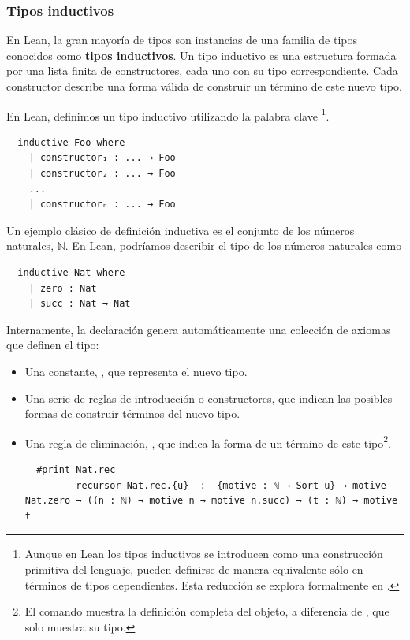 \subsubsection{Tipos inductivos}

En Lean, la gran mayoría de tipos son instancias de una familia de tipos conocidos como \textbf{tipos inductivos}. Un tipo inductivo es una estructura formada por una lista finita de constructores, cada uno con su tipo correspondiente. Cada constructor describe una forma válida de construir un término de este nuevo tipo.

En Lean, definimos un tipo inductivo utilizando la palabra clave \footnote{Aunque en Lean los tipos inductivos se introducen como una construcción primitiva del lenguaje, pueden definirse de manera equivalente sólo en términos de tipos dependientes. Esta reducción se explora formalmente en \cite{carneiro2019type}.}.

\begin{lstlisting}
  inductive Foo where
    | constructor₁ : ... → Foo
    | constructor₂ : ... → Foo
    ...
    | constructorₙ : ... → Foo
\end{lstlisting}

Un ejemplo clásico de definición inductiva es el conjunto de los números naturales, $\mathbb{N}$. En Lean, podríamos describir el tipo  de los números naturales como

\begin{lstlisting}
  inductive Nat where
    | zero : Nat
    | succ : Nat → Nat
\end{lstlisting}

Internamente, la declaración  genera automáticamente una colección de axiomas que definen el tipo:

\begin{itemize}
  \item Una constante, , que representa el nuevo tipo.
  \item Una serie de reglas de introducción o constructores, que indican las posibles formas de construir términos del nuevo tipo. 
  \item Una regla de eliminación, , que indica la forma de  un término de este tipo\footnote{El comando  muestra la definición completa del objeto, a diferencia de , que solo muestra su tipo.}.
  \begin{lstlisting}
  #print Nat.rec
      -- recursor Nat.rec.{u}  :  {motive : ℕ → Sort u} → motive Nat.zero → ((n : ℕ) → motive n → motive n.succ) → (t : ℕ) → motive t\end{lstlisting}\end{itemize}

